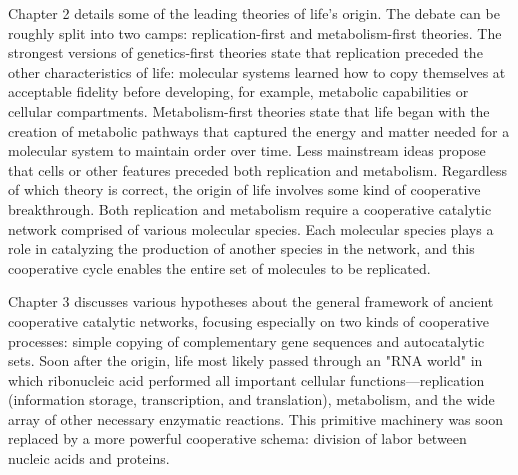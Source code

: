 \documentclass{tufte-book} %
\begin{document}
Chapter 2 details some of the leading theories of life's origin. The debate can be roughly split into two camps: replication-first and metabolism-first theories. The strongest versions of genetics-first theories state that replication preceded the other characteristics of life: molecular systems learned how to copy themselves at acceptable fidelity before developing, for example, metabolic capabilities or cellular compartments. Metabolism-first theories state that life began with the creation of metabolic pathways that captured the energy and matter needed for a molecular system to maintain order over time. Less mainstream ideas propose that cells or other features preceded both replication and metabolism. Regardless of which theory is correct, the origin of life involves some kind of cooperative breakthrough. Both replication and metabolism require a cooperative catalytic network comprised of various molecular species. Each molecular species plays a role in catalyzing the production of another species in the network, and this cooperative cycle enables the entire set of molecules to be replicated.

Chapter 3 discusses various hypotheses about the general framework of ancient cooperative catalytic networks, focusing especially on two kinds of cooperative processes: simple copying of complementary gene sequences and autocatalytic sets. Soon after the origin, life most likely passed through an "RNA world" in which ribonucleic acid performed all important cellular functions—replication (information storage, transcription, and translation), metabolism, and the wide array of other necessary enzymatic reactions. This primitive machinery was soon replaced by a more powerful cooperative schema: division of labor between nucleic acids and proteins.
\end{document}
